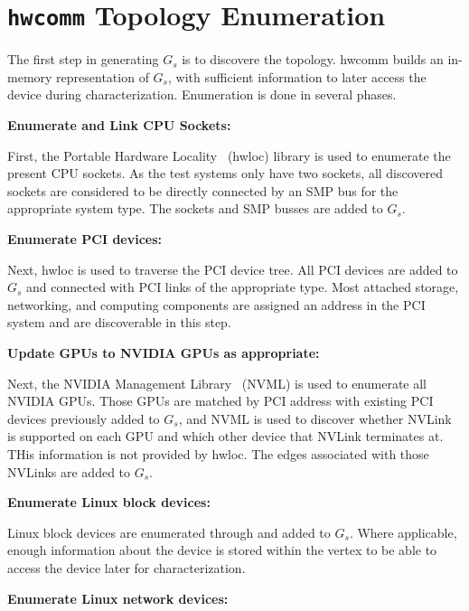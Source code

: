 %
%
\section{\texttt{hwcomm} Topology Enumeration}
\label{sec:topology-exploration}

The first step in generating $G_s$ is to discovere the topology.
hwcomm builds an in-memory representation of $G_s$, with sufficient information to later access the device during characterization.
Enumeration is done in several phases.

\textbf{Enumerate and Link CPU Sockets:}

First, the Portable Hardware Locality~\cite{broquedis2010hwloc} (hwloc) library is used to enumerate the present CPU sockets.
As the test systems only have two sockets, all discovered sockets are considered to be directly connected by an SMP bus for the appropriate system type.
The sockets and SMP busses are added to $G_s$.

\textbf{Enumerate PCI devices:}

Next, hwloc is used to traverse the PCI device tree.
All PCI devices are added to $G_s$ and connected with PCI links of the appropriate type.
Most attached storage, networking, and computing components are assigned an address in the PCI system and are discoverable in this step.


\textbf{Update GPUs to NVIDIA GPUs as appropriate:}

Next, the NVIDIA Management Library~\cite{nvidia2017nvml} (NVML) is used to enumerate all NVIDIA GPUs.
Those GPUs are matched by PCI address with existing PCI devices previously added to $G_s$, and NVML is used to discover whether NVLink is supported on each GPU and which other device that NVLink terminates at.
THis information is not provided by hwloc.
The edges associated with those NVLinks are added to $G_s$.


\textbf{Enumerate Linux block devices:}

Linux block devices are enumerated through  and added to $G_s$.
Where applicable, enough information about the device is stored within the vertex to be able to access the device later for characterization.

\textbf{Enumerate Linux network devices:}

